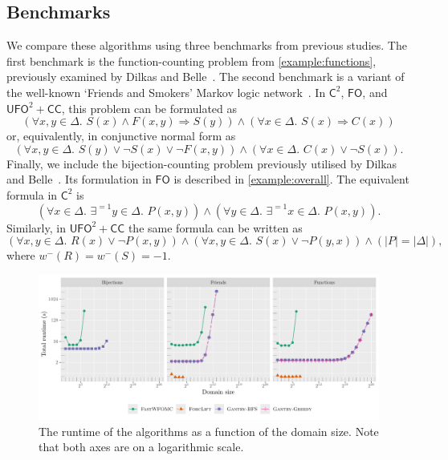 \documentclass[a4paper,UKenglish,cleveref, autoref, thm-restate]{lipics-v2021}
\newcommand{\Ctwo}{$\mathsf{C}^{2}$}
\newcommand{\FO}{$\mathsf{FO}$}
\newcommand{\UFO}{$\mathsf{UFO}^{2} + \mathsf{CC}$}
\begin{document}
\subsection{Benchmarks}

We compare these algorithms using three benchmarks from previous studies. The
first benchmark is the function-counting problem from \cref{example:functions},
previously examined by Dilkas and Belle~\cite{DBLP:conf/kr/DilkasB23}. The
second benchmark is a variant of the well-known `Friends and Smokers' Markov
logic network~\cite{DBLP:conf/aaai/SinglaD08,DBLP:conf/uai/BroeckCD12}. In
\Ctwo{}, \FO{}, and \UFO{}, this problem can be formulated as
\[
  (\forall x,y \in \Delta\text{. } S(x) \land F(x, y) \Rightarrow S(y)) \land (\forall x \in \Delta\text{. }S(x) \Rightarrow C(x))
\]
or, equivalently, in conjunctive normal form as
\[
  (\forall x,y \in \Delta\text{. }S(y) \lor \neg S(x) \lor \neg F(x, y)) \land (\forall x \in \Delta\text{. } C(x) \lor \neg S(x)).
\]
Finally, we include the bijection-counting problem previously utilised by Dilkas
and Belle~\cite{DBLP:conf/kr/DilkasB23}. Its formulation in \FO{} is described
in \cref{example:overall}. The equivalent formula in \Ctwo{} is
\[
  (\forall x \in \Delta\text{. }\exists^{=1} y \in \Delta\text{. }P(x, y)) \land (\forall y \in \Delta\text{. }\exists^{=1} x \in \Delta\text{. }P(x, y)).
\]
Similarly, in \UFO{} the same formula can be written as
\[
  (\forall x, y \in \Delta\text{. }R(x) \lor \neg P(x, y)) \land (\forall x, y \in \Delta\text{. }S(x) \lor \neg P(y, x)) \land (|P| = |\Delta|),
\]
where $w^{-}(R) = w^{-}(S) = -1$.

\begin{figure}[t]
  \centering
  \includegraphics{plot.pdf}
  \caption{The runtime of the algorithms as a function of the domain size. Note
    that both axes are on a logarithmic scale.}\label{fig:plot}
\end{figure}
\end{document}
